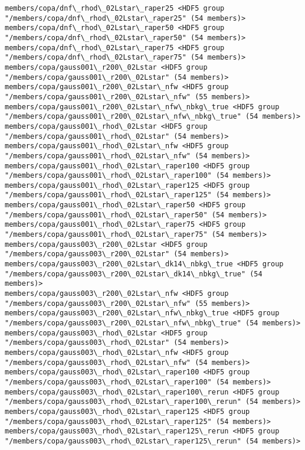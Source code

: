 \documentclass[11pt]{article}
\begin{document}
\begin{Verbatim}[commandchars=\\\{\}]
members/copa/dnf\_rhod\_02Lstar\_raper25 <HDF5 group "/members/copa/dnf\_rhod\_02Lstar\_raper25" (54 members)>
members/copa/dnf\_rhod\_02Lstar\_raper50 <HDF5 group "/members/copa/dnf\_rhod\_02Lstar\_raper50" (54 members)>
members/copa/dnf\_rhod\_02Lstar\_raper75 <HDF5 group "/members/copa/dnf\_rhod\_02Lstar\_raper75" (54 members)>
members/copa/gauss001\_r200\_02Lstar <HDF5 group "/members/copa/gauss001\_r200\_02Lstar" (54 members)>
members/copa/gauss001\_r200\_02Lstar\_nfw <HDF5 group "/members/copa/gauss001\_r200\_02Lstar\_nfw" (55 members)>
members/copa/gauss001\_r200\_02Lstar\_nfw\_nbkg\_true <HDF5 group "/members/copa/gauss001\_r200\_02Lstar\_nfw\_nbkg\_true" (54 members)>
members/copa/gauss001\_rhod\_02Lstar <HDF5 group "/members/copa/gauss001\_rhod\_02Lstar" (54 members)>
members/copa/gauss001\_rhod\_02Lstar\_nfw <HDF5 group "/members/copa/gauss001\_rhod\_02Lstar\_nfw" (54 members)>
members/copa/gauss001\_rhod\_02Lstar\_raper100 <HDF5 group "/members/copa/gauss001\_rhod\_02Lstar\_raper100" (54 members)>
members/copa/gauss001\_rhod\_02Lstar\_raper125 <HDF5 group "/members/copa/gauss001\_rhod\_02Lstar\_raper125" (54 members)>
members/copa/gauss001\_rhod\_02Lstar\_raper50 <HDF5 group "/members/copa/gauss001\_rhod\_02Lstar\_raper50" (54 members)>
members/copa/gauss001\_rhod\_02Lstar\_raper75 <HDF5 group "/members/copa/gauss001\_rhod\_02Lstar\_raper75" (54 members)>
members/copa/gauss003\_r200\_02Lstar <HDF5 group "/members/copa/gauss003\_r200\_02Lstar" (54 members)>
members/copa/gauss003\_r200\_02Lstar\_dk14\_nbkg\_true <HDF5 group "/members/copa/gauss003\_r200\_02Lstar\_dk14\_nbkg\_true" (54 members)>
members/copa/gauss003\_r200\_02Lstar\_nfw <HDF5 group "/members/copa/gauss003\_r200\_02Lstar\_nfw" (55 members)>
members/copa/gauss003\_r200\_02Lstar\_nfw\_nbkg\_true <HDF5 group "/members/copa/gauss003\_r200\_02Lstar\_nfw\_nbkg\_true" (54 members)>
members/copa/gauss003\_rhod\_02Lstar <HDF5 group "/members/copa/gauss003\_rhod\_02Lstar" (54 members)>
members/copa/gauss003\_rhod\_02Lstar\_nfw <HDF5 group "/members/copa/gauss003\_rhod\_02Lstar\_nfw" (54 members)>
members/copa/gauss003\_rhod\_02Lstar\_raper100 <HDF5 group "/members/copa/gauss003\_rhod\_02Lstar\_raper100" (54 members)>
members/copa/gauss003\_rhod\_02Lstar\_raper100\_rerun <HDF5 group "/members/copa/gauss003\_rhod\_02Lstar\_raper100\_rerun" (54 members)>
members/copa/gauss003\_rhod\_02Lstar\_raper125 <HDF5 group "/members/copa/gauss003\_rhod\_02Lstar\_raper125" (54 members)>
members/copa/gauss003\_rhod\_02Lstar\_raper125\_rerun <HDF5 group "/members/copa/gauss003\_rhod\_02Lstar\_raper125\_rerun" (54 members)>

\end{Verbatim}
\end{document}
